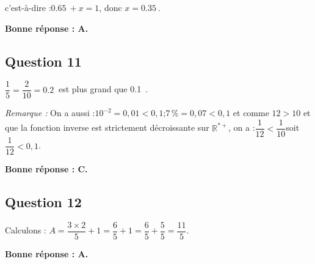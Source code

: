 \documentclass[10pt]{article}
\providecommand{\R}{\mathbb{R}}
\providecommand{\np}[2][]{{#2~#1}}
\begin{document}
	c'est-à-dire :\quad $\np{0.65}+x = 1$, \quad donc \quad $x = \np{0.35}$.

	\textbf{Bonne réponse : A.}

\subsection*{Question 11}
	$\dfrac15 = \dfrac{2}{10} = \np{0.2}$ est plus grand que \np{0.1}.

	\emph{Remarque :} On a aussi :$10^{-2} = 0,01 < 0,1$;\quad $7\,\% = 0,07 < 0,1$ \quad et  comme \quad $12 > 10$ \quad et que la fonction inverse est strictement décroissante  sur $\R^{*+}$, on a :\quad $\dfrac{1}{12} < \dfrac{1}{10}$\quad soit \quad $\dfrac{1}{12} < 0,1$.

	\textbf{Bonne réponse : C.}

\subsection*{Question 12}
	Calculons :\quad
	$A = \dfrac{3 \times 2}{5} + 1 = \dfrac{6}{5} + 1 = \dfrac65+\dfrac55 = \dfrac{11}{5}$.

	\textbf{Bonne réponse : A.}

\end{document}
